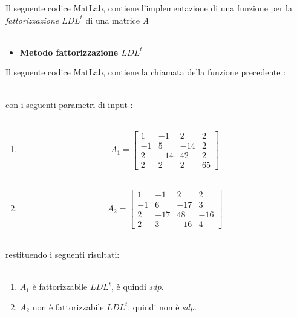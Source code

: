 Il seguente codice MatLab, contiene l'implementazione di una funzione per la \textit{fattorizzazione} $LDL^t$ di una matrice \textit{A}\\\
\begin{itemize}
	\item \textbf{Metodo fattorizzazione $LDL^t$}
		
\end{itemize}
Il seguente codice MatLab, contiene la chiamata della funzione precedente :\\\
	
con i seguenti parametri di input :\\\
\begin{enumerate}
	\item
		\[
		A_1 =\begin{bmatrix}
			1  & -1  & 2   & 2  \\ 
			-1 & 5   & -14 & 2  \\
			2  & -14 & 42  & 2  \\
			2  & 2   & 2   & 65 
		\end{bmatrix}
		\]\\
	\item
		\[
		A_2 =\begin{bmatrix}
			1  & -1  & 2   & 2   \\ 
			-1 & 6   & -17 & 3   \\
			2  & -17 & 48  & -16 \\
			2  & 3   & -16 & 4   
		\end{bmatrix}
		\]\\
\end{enumerate}
restituendo i seguenti risultati:\\\
\begin{enumerate}
	\item
		$A_1$ è fattorizzabile $LDL^t$, è quindi \textit{sdp}.
	\item
		$A_2$ non è fattorizzabile $LDL^t$, quindi non è \textit{sdp}.
\end{enumerate}